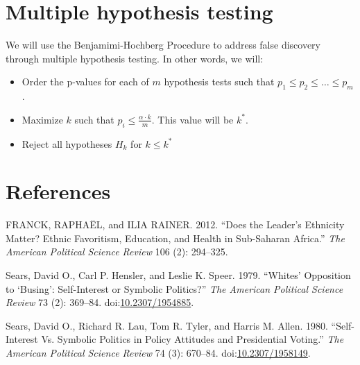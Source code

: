 \documentclass[]{article}
\begin{document}
\section{Multiple hypothesis testing}\label{multiple-hypothesis-testing}

We will use the Benjamimi-Hochberg Procedure to address false discovery
through multiple hypothesis testing. In other words, we will:

\begin{itemize}
  \item Order the p-values for each of $m$ hypothesis tests such that $p_1 \leq p_2 \leq \ldots \leq p_m$.
  \item Maximize $k$ such that $p_i \leq \frac{\alpha \cdot k}{m}$. This value will be $k^*$.
  \item Reject all hypotheses $H_k$ for $k \leq k^*$
\end{itemize}

\section*{References}\label{references}

\hypertarget{refs}{}
\hypertarget{ref-franck_does_2012}{}
FRANCK, RAPHAËL, and ILIA RAINER. 2012. ``Does the Leader's Ethnicity
Matter? Ethnic Favoritism, Education, and Health in Sub-Saharan
Africa.'' \emph{The American Political Science Review} 106 (2):
294--325.

\hypertarget{ref-sears_whites_1979}{}
Sears, David O., Carl P. Hensler, and Leslie K. Speer. 1979. ``Whites'
Opposition to `Busing': Self-Interest or Symbolic Politics?'' \emph{The
American Political Science Review} 73 (2): 369--84.
doi:\href{https://doi.org/10.2307/1954885}{10.2307/1954885}.

\hypertarget{ref-sears_self-interest_1980}{}
Sears, David O., Richard R. Lau, Tom R. Tyler, and Harris M. Allen.
1980. ``Self-Interest Vs. Symbolic Politics in Policy Attitudes and
Presidential Voting.'' \emph{The American Political Science Review} 74
(3): 670--84.
doi:\href{https://doi.org/10.2307/1958149}{10.2307/1958149}.
\end{document}

